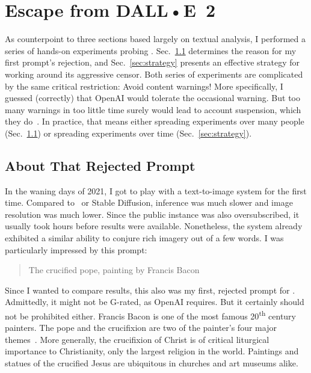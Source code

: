 
\section{Escape from DALL•E~2}
\label{sec:escape}

As counterpoint to three sections based largely on textual analysis, I performed
a series of hands-on experiments probing \DALLE. Sec.\ \ref{sec:crucifixion}
determines the reason for my first prompt's rejection, and Sec.\
\ref{sec:strategy} presents an effective strategy for working around its
aggressive censor. Both series of experiments are complicated by the same
critical restriction: Avoid content warnings! More specifically, I guessed
(correctly) that OpenAI would tolerate the occasional warning. But too many
warnings in too little time surely would lead to account suspension, which they
do~\cite{SpicyElephant2022}. In practice, that means either spreading
experiments over many people (Sec.\ \ref{sec:crucifixion}) or spreading
experiments over time (Sec.\ \ref{sec:strategy}).


\subsection{About That Rejected Prompt}
\label{sec:crucifixion}

In the waning days of 2021, I got to play with a text-to-image system for the
first time. Compared to \DALLE\ or Stable Diffusion, inference was much slower
and image resolution was much lower. Since the public instance was also
oversubscribed, it usually took hours before results were available.
Nonetheless, the system already exhibited a similar ability to conjure rich
imagery out of a few words. I was particularly impressed by this prompt:

\begin{quote}
\openfat{}The crucified pope, painting by Francis Bacon\closefat{}
\end{quote}

\noindent{}Since I wanted to compare results, this also was my first, rejected
prompt for \DALLE. Admittedly, it might not be G-rated, as OpenAI requires. But
it certainly should not be prohibited either. Francis Bacon is one of the most
famous 20\textsuperscript{th} century painters. The pope and the crucifixion are
two of the painter's four major themes~\cite{Wikipedia2023}. More generally, the
crucifixion of Christ is of critical liturgical importance to Christianity, only
the largest religion in the world. Paintings and statues of the crucified Jesus
are ubiquitous in churches and art museums alike.

